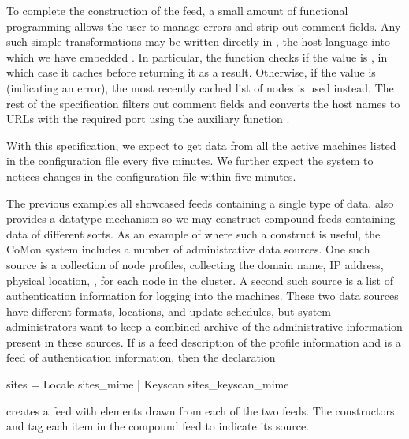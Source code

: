 To complete the construction of the  feed,
a small amount of functional programming allows the user 
to manage errors and strip out comment fields.  Any such simple
transformations may be written directly in \ocaml{}, the host language 
into which we have embedded \padsd{}.  In particular, 
the  function checks if
the  value is , in which case it caches 
before returning it as a result.  Otherwise, if the  value
is  (indicating an error), the most recently cached list of nodes 
is used instead.  The
rest of the  specification filters out comment fields and 
converts the host names to URLs with the required port using the
auxiliary function .


With this specification, we
expect to get data from all the active machines listed in the
configuration file every five minutes.  We further expect the system to
notices changes in the configuration file within five minutes.


The previous examples all showcased feeds containing a single type
of data.  \padsd{} also provides a datatype mechanism so we may
construct compound feeds containing data of different sorts.  As an
example of where such a construct is useful, the CoMon system includes a
number of administrative data sources.  One such source is a collection of
node profiles, collecting the domain name, IP address, physical
location, \etc, for each node in the cluster.  A second such source is a
list of authentication information for logging into the machines.
These two data sources have different formats, locations, and update
schedules, but system administrators want to keep a combined archive
of the administrative information present in these sources.  If
 is a feed description of the profile
information and  is a feed of authentication
information, then the declaration
%
\begin{code}
 sites = 
    Locale  sites_mime
  | Keyscan  sites_keyscan_mime
\end{code}
%
creates a feed with elements drawn from each of the two 
feeds.  The constructors  and  tag each item in
the compound feed to indicate its source. 

